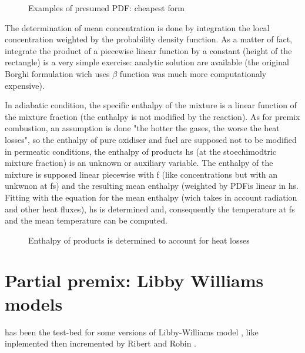 \begin{figure}[h]
\caption{Examples of presumed PDF: cheapest form}
\end{figure}
The determination of mean concentration is done by integration the
local concentration weighted by the probability density function. As a
matter of fact, integrate the product of a piecewise linear function
by a constant ({\small height of the rectangle}) is a very simple
exercise: analytic solution are available ({\small the original
Borghi formulation \cite{3} wich uses $\beta$ function was much more
computationaly expensive}).

In adiabatic condition, the specific enthalpy of the mixture is a
linear function of the mixture fraction ({\small the enthalpy is not
modified by the reaction}). As for premix combustion, an assumption is
done "the hotter the gases, the worse the heat losses", so the
enthalpy of pure oxidiser and fuel are supposed not to be modified in
permeatic conditions, the enthalpy of products hs ({\small at the
stoechimodtric mixture fraction}) is an unknown or auxiliary
variable. The enthalpy of the mixture is supposed linear piecewise
with f ({\small like concentrations but with an unkwnon at fs}) and
the resulting mean enthalpy ({\small weighted by PDF}is linear in
hs. Fitting with the equation for the mean enthalpy ({\small wich
takes in account radiation and other heat fluxes}), hs is determined
and, consequently the temperature at fs and the mean temperature can
be computed.

\begin{figure}[h]
\caption{Enthalpy of products is determined to account for heat losses }
\end{figure}

\section{Partial premix: Libby Williams models}


\CS has been the test-bed for some versions of Libby-Williams model \cite{2}, like inplemented then incremented by Ribert \cite{5} and Robin \cite{6}.

